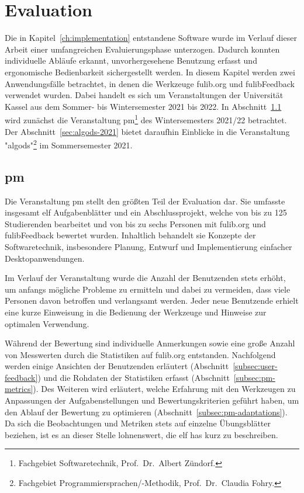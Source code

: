 \chapter{Evaluation}\label{ch:evaluation}

Die in Kapitel~\ref{ch:implementation} entstandene Software wurde im Verlauf dieser Arbeit einer umfangreichen Evaluierungsphase unterzogen.
Dadurch konnten individuelle Abläufe erkannt, unvorhergesehene Benutzung erfasst und ergonomische Bedienbarkeit sichergestellt werden.
In diesem Kapitel werden zwei Anwendungsfälle betrachtet, in denen die Werkzeuge fulib.org und fulibFeedback verwendet wurden.
Dabei handelt es sich um Veranstaltungen der Universität Kassel aus dem Sommer- bis Wintersemester 2021 bis 2022.
In Abschnitt~\ref{sec:pm-2021-2022} wird zunächst die Veranstaltung \ac{pm}\footnote{
    Fachgebiet Softwaretechnik, Prof.\ Dr.\ Albert Zündorf.
} des Wintersemesters 2021/22 betrachtet.
Der Abschnitt~\ref{sec:algods-2021} bietet daraufhin Einblicke in die Veranstaltung "\acl{algods}"\footnote{
    Fachgebiet Programmiersprachen/-Methodik, Prof.\ Dr.\ Claudia Fohry.\label{fn:fg-plm}
} im Sommersemester 2021.

\section{\acl{pm}}\label{sec:pm-2021-2022}

Die Veranstaltung \ac{pm} stellt den größten Teil der Evaluation dar.
Sie umfasste insgesamt elf Aufgabenblätter und ein Abschlussprojekt, welche von bis zu 125 Studierenden bearbeitet und von bis zu sechs Personen mit fulib.org und fulibFeedback bewertet wurden.
Inhaltlich behandelt sie Konzepte der Softwaretechnik, insbesondere Planung, Entwurf und Implementierung einfacher Desktopanwendungen.

Im Verlauf der Veranstaltung wurde die Anzahl der Benutzenden stets erhöht, um anfangs mögliche Probleme zu ermitteln und dabei zu vermeiden, dass viele Personen davon betroffen und verlangsamt werden.
Jeder neue Benutzende erhielt eine kurze Einweisung in die Bedienung der Werkzeuge und Hinweise zur optimalen Verwendung.

Während der Bewertung sind individuelle Anmerkungen sowie eine große Anzahl von Messwerten durch die Statistiken auf fulib.org entstanden.
Nachfolgend werden einige Ansichten der Benutzenden erläutert (Abschnitt~\ref{subsec:user-feedback}) und die Rohdaten der Statistiken erfasst (Abschnitt~\ref{subsec:pm-metrics}).
Des Weiteren wird erläutert, welche Erfahrung mit den Werkzeugen zu Anpassungen der Aufgabenstellungen und Bewertungskriterien geführt haben, um den Ablauf der Bewertung zu optimieren (Abschnitt~\ref{subsec:pm-adaptations}).
Da sich die Beobachtungen und Metriken stets auf einzelne Übungsblätter beziehen, ist es an dieser Stelle lohnenswert, die elf \acp{ha} kurz zu beschreiben.

